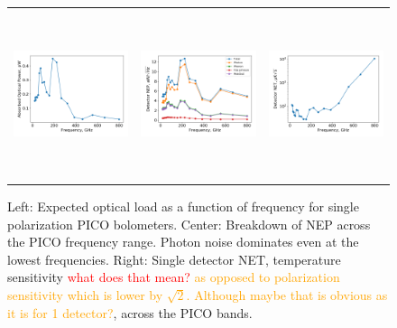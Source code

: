 \documentclass[]{spie}  %
\newcommand{\comr}[1]{\textcolor{red}{#1}}
\newcommand{\como}[1]{\textcolor{orange}{#1}}
\begin{document}
\begin{figure} [ht]
\begin{center}
\begin{tabular}{ccc} %
\hspace{-1.4cm} \includegraphics[height=4.9cm]{system_Popt.png} & \hspace{-0.7cm} \includegraphics[height=4.9cm]{system_NEP.png} &\hspace{-0.7cm}  \includegraphics[height=4.9cm]{system_NET.png} 
\end{tabular}
\end{center}
\caption{ \label{fig:popt} \label{fig:noise} \label{fig:net} 
Left: Expected optical load as a function of frequency for single polarization PICO bolometers. 
Center: Breakdown of NEP across the PICO frequency range.  Photon noise dominates even at the lowest frequencies. 
Right: Single detector NET, temperature sensitivity \comr{what does that mean?} \como{as opposed to polarization sensitivity which is lower by $\sqrt{2}$.
Although maybe that is obvious as it is for 1 detector?}, across the PICO bands. 
}
\end{figure} 
\end{document}
